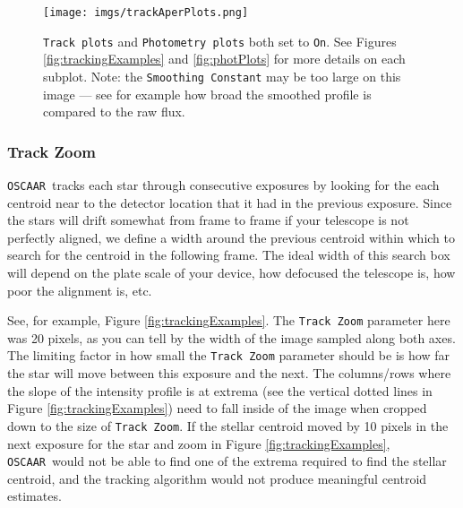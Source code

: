 \documentclass[a4paper]{article}
\newcommand{\code}[1]{\texttt{#1}}
\newcommand{\oscaar}{\code{OSCAAR}~}
\begin{document}
\begin{figure}[H]
\begin{center}
\texttt{[image: imgs/trackAperPlots.png]}
\caption{\code{Track plots} and \code{Photometry plots} both set to \code{On}. See Figures \ref{fig:trackingExamples} and \ref{fig:photPlots} for more details on each subplot. Note: the \code{Smoothing Constant} may be too large on this image --- see for example how broad the smoothed profile is compared to the raw flux. }
\label{fig:trackAndPhotPlot}
\end{center}	
\end{figure}

\subsubsection{Track Zoom}
\oscaar tracks each star through consecutive exposures by looking for the each centroid near to the detector location that it had in the previous exposure. Since the stars will drift somewhat from frame to frame if your telescope is not perfectly aligned, we define a width around the previous centroid within which to search for the centroid in the following frame. The ideal width of this search box will depend on the plate scale of your device, how defocused the telescope is, how poor the alignment is, etc. 

See, for example, Figure \ref{fig:trackingExamples}. The \code{Track Zoom} parameter here was 20 pixels, as you can tell by the width of the image sampled along both axes. The limiting factor in how small the \code{Track Zoom} parameter should be is how far the star will move between this exposure and the next. The columns/rows where the slope of the intensity profile is at extrema (see the vertical dotted lines in Figure \ref{fig:trackingExamples}) need to fall inside of the image when cropped down to the size of \code{Track Zoom}. If the stellar centroid moved by 10 pixels in the next exposure for the star and zoom in Figure \ref{fig:trackingExamples}, \oscaar would not be able to find one of the extrema required to find the stellar centroid, and the tracking algorithm would not produce meaningful centroid estimates.
\end{document}

